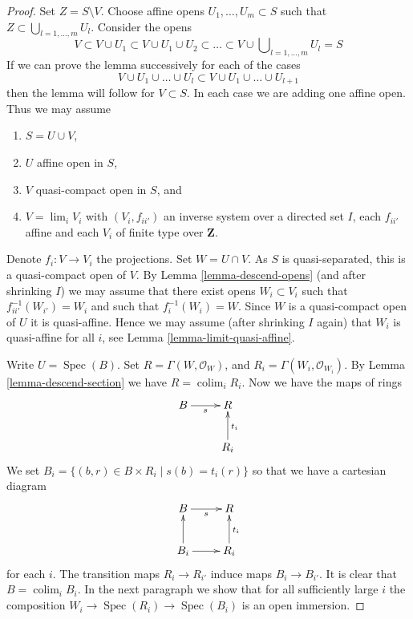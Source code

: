 \documentclass{amsart}
\theoremstyle{plain}
\theoremstyle{definition}
\theoremstyle{remark}
\numberwithin{equation}{subsection}
\def\lim{\mathop{\mathrm{lim}}\nolimits}
\def\colim{\mathop{\mathrm{colim}}\nolimits}
\def\Spec{\mathop{\mathrm{Spec}}}
\begin{document}
\begin{proof}
Set $Z = S \setminus V$. Choose affine opens $U_1, \ldots, U_m \subset S$
such that $Z \subset \bigcup_{l = 1, \ldots, m} U_l$. Consider the opens
$$
V \subset V \cup U_1 \subset V \cup U_1 \cup U_2 \subset
\ldots \subset V \cup \bigcup\nolimits_{l = 1, \ldots, m} U_l = S
$$
If we can prove the lemma successively for each of the cases
$$
V \cup U_1 \cup \ldots \cup U_l
\subset
V \cup U_1 \cup \ldots \cup U_{l + 1}
$$
then the lemma will follow for $V \subset S$. In each case we are adding
one affine open. Thus we may assume
\begin{enumerate}
\item $S = U \cup V$,
\item $U$ affine open in $S$,
\item $V$ quasi-compact open in $S$, and
\item $V = \lim_i V_i$ with $(V_i, f_{ii'})$
an inverse system over a directed set $I$, each $f_{ii'}$
affine and each $V_i$ of finite type over $\mathbf{Z}$.
\end{enumerate}
Denote $f_i : V \to V_i$ the projections.
Set $W = U \cap V$. As $S$ is quasi-separated, this is a quasi-compact open
of $V$. By Lemma \ref{lemma-descend-opens}
(and after shrinking $I$) we may assume that there exist
opens $W_i \subset V_i$ such that $f_{ii'}^{-1}(W_{i'}) = W_i$
and such that $f_i^{-1}(W_i) = W$. Since $W$ is a quasi-compact open
of $U$ it is quasi-affine. Hence we may assume (after shrinking $I$ again)
that $W_i$ is quasi-affine for all $i$, see
Lemma \ref{lemma-limit-quasi-affine}.

\medskip\noindent
Write $U = \Spec(B)$. Set $R = \Gamma(W, \mathcal{O}_W)$,
and $R_i = \Gamma(W_i, \mathcal{O}_{W_i})$.
By Lemma \ref{lemma-descend-section} we have $R = \colim_i R_i$.
Now we have the maps of rings
$$
\xymatrix{
B \ar[r]_s & R \\
& R_i \ar[u]_{t_i}
}
$$
We set $B_i = \{(b, r) \in B \times R_i \mid s(b) = t_i(r)\}$ so that we
have a cartesian diagram
$$
\xymatrix{
B \ar[r]_s & R \\
B_i \ar[u] \ar[r] & R_i \ar[u]_{t_i}
}
$$
for each $i$. The transition maps $R_i \to R_{i'}$ induce maps
$B_i \to B_{i'}$. It is clear that $B = \colim_i B_i$.
In the next paragraph we show that for all sufficiently large $i$
the composition $W_i \to \Spec(R_i) \to \Spec(B_i)$ is an open immersion.


\end{proof}
\end{document}
